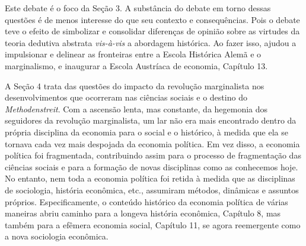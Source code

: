 \documentclass[12pt]{article}
\begin{document}
Este debate é o foco da Seção 3. A substância do debate em torno dessas questões é de menos interesse do que seu contexto e consequências. Pois o debate teve o efeito de simbolizar e consolidar diferenças de opinião sobre as virtudes da teoria dedutiva abstrata \textit{vis-à-vis} a abordagem histórica. Ao fazer isso, ajudou a impulsionar e delinear as fronteiras entre a Escola Histórica Alemã e o marginalismo, e inaugurar a Escola Austríaca de economia, Capítulo 13.

A Seção 4 trata das questões do impacto da revolução marginalista nos desenvolvimentos que ocorreram nas ciências sociais e o destino do \textit{Methodenstreit}. Com a ascensão lenta, mas constante, da hegemonia dos seguidores da revolução marginalista, um lar não era mais encontrado dentro da própria disciplina da economia para o social e o histórico, à medida que ela se tornava cada vez mais despojada da economia política. Em vez disso, a economia política foi fragmentada, contribuindo assim para o processo de fragmentação das ciências sociais e para a formação de novas disciplinas como as conhecemos hoje. No entanto, nem toda a economia política foi retida à medida que as disciplinas de sociologia, história econômica, etc., assumiram métodos, dinâmicas e assuntos próprios. Especificamente, o conteúdo histórico da economia política de várias maneiras abriu caminho para a longeva história econômica, Capítulo 8, mas também para a efêmera economia social, Capítulo 11, se agora reemergente como a nova sociologia econômica.
\end{document}

